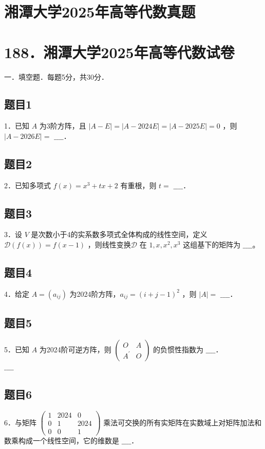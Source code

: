 \documentclass{article}
\begin{document}
\section*{湘潭大学2025年高等代数真题}
\section*{188．湘潭大学2025年高等代数试卷}
一．填空题．每题5分，共30分．\\

\subsection{题目1}
1．已知 \(A\) 为3阶方阵，且 \(|A-E|=|A-2024 E|=|A-2025 E|=0\) ，则 \(|A-2026 E|=\) \(\_\_\_\_\)．

\subsection{题目2}
2．已知多项式 \(f(x)=x^{3}+t x+2\) 有重根，则 \(t=\) \(\_\_\_\_\)．

\subsection{题目3}
3．设 \(V\) 是次数小于4的实系数多项式全体构成的线性空间，定义 \(\mathcal{D}(f(x))=f(x-1)\) ，则线性变换\(\mathcal{D}\) 在 \(1, x, x^{2}, x^{3}\) 这组基下的矩阵为 \(\_\_\_\_\)。

\subsection{题目4}
4．给定 \(A=\left(a_{i j}\right)\) 为2024阶方阵，\(a_{i j}=(i+j-1)^{2}\) ，则 \(|A|=\) \(\_\_\_\_\)．

\subsection{题目5}
5．已知 \(A\) 为2024阶可逆方阵，则 \(\left(\begin{array}{cc}O & A \\ A^{\prime} & O\end{array}\right)\) 的负惯性指数为 \(\_\_\_\_\)．\\
\(\_\_\_\_\)

\subsection{题目6}
6．与矩阵 \(\left(\begin{array}{ccc}1 & 2024 & 0 \\ 0 & 1 & 2024 \\ 0 & 0 & 1\end{array}\right)\) 乘法可交换的所有实矩阵在实数域上对矩阵加法和数乘构成一个线性空间，它的维数是 \(\_\_\_\_\)．
\end{document}
